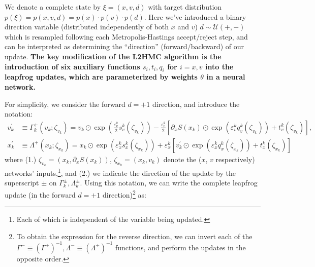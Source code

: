 \documentclass{article} %
\begin{document}
We denote a complete state by \(\xi = (x, v, d)\) with target distribution \(p(\xi) = p(x, v, d) = p(x)\cdot p(v)\cdot
p(d)\).
%
Here we've introduced a binary direction variable (distributed independently of both \(x\) and \(v\))
\(d\sim\mathcal{U}(+,-)\) which is resampled following each Metropolis-Hastings accept/reject step, and can be
interpreted as determining the ``direction'' (forward/backward) of our update.
%
\textbf{The key modification of the L2HMC algorithm is the introduction of six auxiliary functions \(s_{i}, t_{i}, q_{i}\) for \(i
= x, v\) into the leapfrog updates, which are parameterized by weights \(\theta\) in a neural network.}
%
%

For simplicity, we consider the forward \(d=+1\) direction, and introduce the notation:
%
\begin{align}
   v^{\prime}_{k} &\equiv \Gamma^{+}_{k}(v_{k};\zeta_{v_{k}})
   = v_{k}\odot \exp{\left(\tfrac{\varepsilon^{k}_{v}}{2}s_{v}^{k}(\zeta_{v_{k}})\right)} -
   \tfrac{\varepsilon^{k}_{v}}{2}{\left[\partial_{x}S(x_{k})\odot\exp{\left(\varepsilon^{k}_{v} q_{v}^{k}(\zeta_{v_{k}})\right)}
      +t_{v}^{k}(\zeta_{v_{k}})\right]},\label{eq:new_momentum_update}\\
   x^{\prime}_{k} &\equiv \Lambda^{+}(x_{k};\zeta_{x_{k}})
   = x_{k}\odot\exp(\varepsilon^{k}_{x} s^{k}_{x}(\zeta_{x_{k}}))
   + \varepsilon^{k}_{x}\left[v^{\prime}_{k}\odot\exp(\varepsilon^{k}_{x} q^{k}_{x}(\zeta_{x_{k}}))
         + t^{k}_{x}(\zeta_{x_{k}})\right]\label{eq:new_position_update}
\end{align}
%
where (1.) \(\zeta_{v_{k}} = (x_{k}, \partial_{x}S(x_{k}))\), \(\zeta_{x_{k}} = (x_{k}, v_{k})\) denote the (\(x\),
\(v\) respectively) networks' inputs,\footnote{%
   Each of which is independent of the variable being updated.
}, and (2.) we indicate the direction of the update by the superscript \(\pm\) on \(\Gamma^{\pm}_{k},
\Lambda^{\pm}_{k}\).
%
Using this notation, we can write the complete leapfrog update (in the forward \(d=+1\) direction)\footnote{%
   To obtain the expression for the reverse direction, we can invert each of the
   \(\Gamma^{-}\equiv{\left(\Gamma^{+}\right)}^{-1}, \Lambda^{-}\equiv{\left(\Lambda^{+}\right)}^{-1}\) functions, and
   perform the updates in the opposite order.
}%
as:
%
\end{document}
